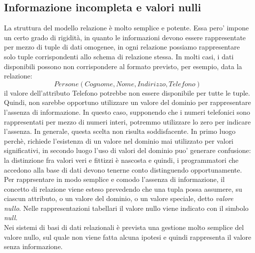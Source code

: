 \documentclass[12pt]{report}
\begin{document}
	\subsection{Informazione incompleta e valori nulli}
	La struttura del modello relazione è molto semplice e potente. Essa pero' impone un certo grado di rigidità, in quanto le informazioni devono essere rappresentate per mezzo di tuple di dati omogenee, in ogni relazione possiamo rappresentare solo tuple corrispondenti allo schema di relazione stessa. In molti casi, i dati disponibili possono non corrispondere al  formato previsto, per esempio, data la relazione:
	\[
	Persone(Cognome, Nome, Indirizzo, Telefono)
	\]
	il valore dell'attributo Telefono potrebbe non essere disponibile per tutte le tuple. Quindi, non sarebbe opportuno utilizzare un valore del dominio per rappresentare l'assenza di informazione. In questo caso, supponendo che i numeri telefonici sono rappresentati per mezzo di numeri interi, potremmo utilizzare lo zero per indicare l'assenza. In generale, questa scelta non risulta soddisfacente. In primo luogo perchè, richiede l'esistenza di un valore nel dominio mai utilizzato per valori significativi, in secondo luogo l'uso di valori del dominio puo' generare confusione: la distinzione fra valori veri e fittizzi è nascosta e quindi, i programmatori che accedono alla base di dati devono tenerne conto distinguendo opportunamente. \\
	Per rapprsentare in modo semplice e comodo l'assenza di informazione, il concetto di relazione viene esteso prevedendo che una tupla possa assumere, su ciascun attributo, o un valore del dominio, o un valore speciale, detto \textit{valore nullo}. Nelle rappresentazioni tabellari il valore nullo viene indicato con il simbolo \textit{null}. \\
	Nei sistemi di basi di dati relazionali è prevista una gestione molto semplice del valore nullo, sul quale non viene fatta alcuna ipotesi e quindi rappresenta il valore senza informazione. \\
\end{document}
